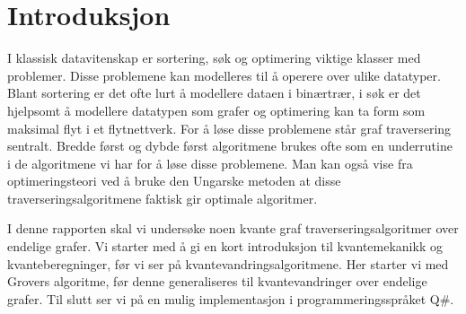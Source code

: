\section{Introduksjon}

    I klassisk datavitenskap er sortering, søk og optimering viktige klasser med problemer. Disse problemene kan modelleres til å operere over ulike datatyper. Blant sortering er det ofte lurt å modellere dataen i binærtrær, i søk er det hjelpsomt å modellere datatypen som grafer og optimering kan ta form som maksimal flyt i et flytnettverk. For å løse disse problemene står graf traversering sentralt. Bredde først og dybde først algoritmene brukes ofte som en underrutine i de algoritmene vi har for å løse disse problemene. Man kan også vise fra optimeringsteori ved å bruke den Ungarske metoden at disse traverseringsalgoritmene faktisk gir optimale algoritmer.

    I denne rapporten skal vi undersøke noen kvante graf traverseringsalgoritmer over endelige grafer. Vi starter med å gi en kort introduksjon til kvantemekanikk og kvanteberegninger, før vi ser på kvantevandringsalgoritmene. Her starter vi med Grovers algoritme, før denne generaliseres til kvantevandringer over endelige grafer. Til slutt ser vi på en mulig implementasjon i programmeringsspråket Q\#.
